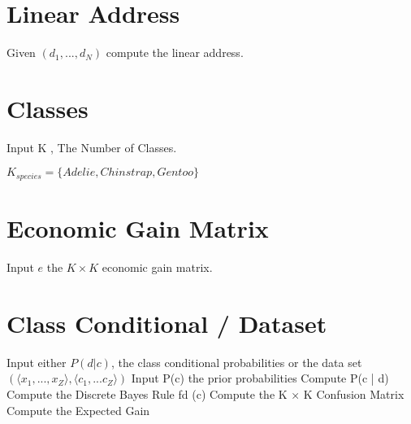 \documentclass[12pt]{article}
\begin{document}
\section*{Linear Address}

Given $(d_1, ... , d_N)$ compute the linear address.

\section*{Classes}

Input K , The Number of Classes.

$K_{species} = \{Adelie, Chinstrap, Gentoo\}$

\section*{Economic Gain Matrix}

Input $e$ the $K \times K$ economic gain matrix.

\section*{Class Conditional / Dataset}

Input either $P(d|c)$, the class conditional probabilities or the data set $(\langle x_1,...,x_Z\rangle,\langle c_1,...c_Z\rangle)$
Input P(c) the prior probabilities Compute P(c | d)
Compute the Discrete Bayes Rule fd (c) Compute the K × K Confusion Matrix Compute the Expected Gain
\end{document}
